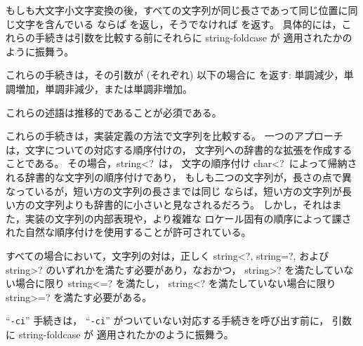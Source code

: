 \begin{entry}{%
}

もしも大文字小文字変換の後，すべての文字列が同じ長さであって同じ位置に同じ文字を含んでいる
ならば \schtrue{} を返し，そうでなければ \schfalse を返す。
具体的には，これらの手続きは引数を比較する前にそれらに {\cf string-foldcase} が
適用されたかのように振舞う。

\end{entry}


\begin{entry}{%
}

これらの手続きは，その引数が (それぞれ) 以下の場合に \schtrue{} を返す:
単調減少，単調増加，単調非減少，または単調非増加。

これらの述語は推移的であることが必須である。

これらの手続きは，実装定義の方法で文字列を比較する。
一つのアプローチは，文字についての対応する順序付けの，
文字列への辞書的な拡張を作成することである。
その場合，{\cf string<?}\ は，
文字の順序付け {\cf char<?}\ によって帰納される辞書的な文字列の順序付けであり，
もしも二つの文字列が，長さの点で異なっているが，短い方の文字列の長さまでは同じ
ならば，短い方の文字列が長い方の文字列よりも辞書的に小さいと見なされるだろう。
しかし，それはまた，実装の文字列の内部表現や，より複雑な
ロケール固有の順序によって課された自然な順序付けを使用することが許可されている。

すべての場合において，文字列の対は，正しく
{\cf string<?}, {\cf string=?}, および {\cf string>?} のいずれかを満たす必要があり，なおかつ，
{\cf string>?} を満たしていない場合に限り {\cf string<=?} を満たし，
{\cf string<?} を満たしていない場合に限り {\cf string>=?} を満たす必要がある。

\hbox{``{\tt -ci}''} 手続きは，
\hbox{``{\tt -ci}''} がついていない対応する手続きを呼び出す前に，
引数に {\cf string-foldcase} が
適用されたかのように振舞う。


\end{entry}

